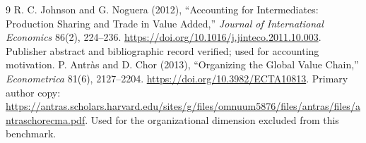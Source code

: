\documentclass[11pt,a4paper]{article}
\theoremstyle{definition}
\theoremstyle{remark}
\begin{document}
\begin{thebibliography}{9}
 R. C. Johnson and G. Noguera (2012), ``Accounting for Intermediates: Production Sharing and Trade in Value Added,'' \emph{Journal of International Economics} 86(2), 224--236. \url{https://doi.org/10.1016/j.jinteco.2011.10.003}. Publisher abstract and bibliographic record verified; used for accounting motivation.
 P. Antr\`as and D. Chor (2013), ``Organizing the Global Value Chain,'' \emph{Econometrica} 81(6), 2127--2204. \url{https://doi.org/10.3982/ECTA10813}. Primary author copy: \url{https://antras.scholars.harvard.edu/sites/g/files/omnuum5876/files/antras/files/antraschorecma.pdf}. Used for the organizational dimension excluded from this benchmark.
\end{thebibliography}
\end{document}

